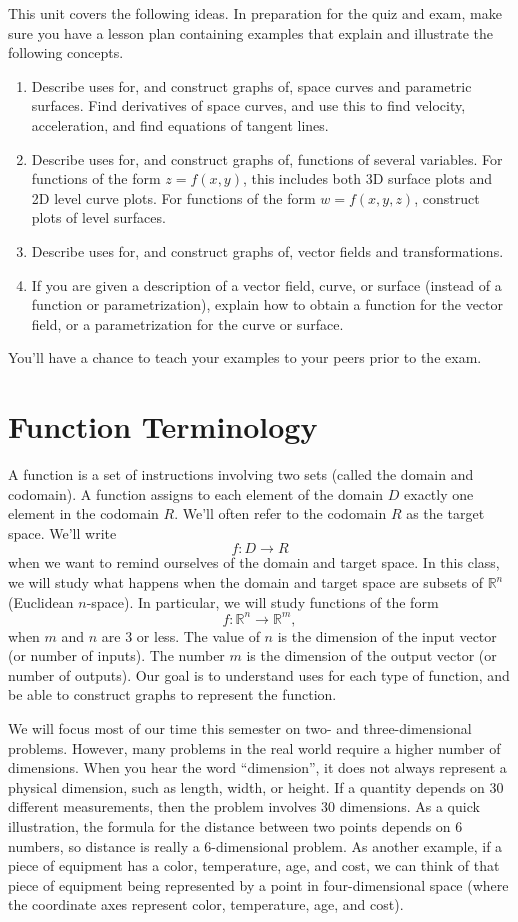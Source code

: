 
\noindent 
This unit covers the following ideas. In preparation for the quiz and exam, make sure you have a lesson plan containing examples that explain and illustrate the following concepts.  
\begin{enumerate}
\item Describe uses for, and construct graphs of, space curves and parametric surfaces. Find derivatives of space curves, and use this to find velocity, acceleration, and find equations of tangent lines.
\item Describe uses for, and construct graphs of, functions of several variables. For functions of the form $z=f(x,y)$, this includes both 3D surface plots and 2D level curve plots.  For functions of the form $w=f(x,y,z)$, construct plots of level surfaces.
\item Describe uses for, and construct graphs of, vector fields and transformations.
\item If you are given a description of a vector field, curve, or surface (instead of a function or parametrization), explain how to obtain a function for the vector field, or a parametrization for the curve or surface.
\end{enumerate}
You'll have a chance to teach your examples to your peers prior to the exam.


\section{Function Terminology}
A function is a set of instructions involving two sets (called the domain and codomain).  A function assigns to each element of the domain $D$ exactly one element in the codomain $R$. We'll often refer to the codomain $R$ as the target space.  We'll write $$f\colon D\to R$$ when we want to remind ourselves of the domain and target space.  In this class, we will study what happens when the domain and target space are subsets of ${\mathbb{R}}^n$ (Euclidean $n$-space).  In particular, we will study functions of the form $$f\colon {\mathbb{R}}^n\to {\mathbb{R}}^m,$$ when $m$ and $n$ are 3 or less. The value of $n$ is the dimension of the input vector (or number of inputs).  The number $m$ is the dimension of the output vector (or number of outputs).  Our goal is to understand uses for each type of function, and be able to construct graphs to represent the function.

We will focus most of our time this semester on two- and three-dimensional problems. However, many problems in the real world require a higher number of dimensions. When you hear the word ``dimension'', it does not always represent a physical dimension, such as length, width, or height.  If a quantity depends on 30 different measurements, then the problem involves 30 dimensions.  As a quick illustration, the formula for the distance between two points depends on 6 numbers, so distance is really a 6-dimensional problem.  As another example, if a piece of equipment has a color, temperature, age, and cost, we can think of that piece of equipment being represented by a point in four-dimensional space (where the coordinate axes represent color, temperature, age, and cost).

